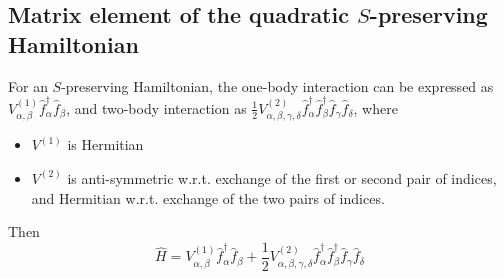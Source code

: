 \documentclass[12pt]{article}
\newcommand{\hc}{^\dagger}
\begin{document}
	\subsection{Matrix element of the quadratic $S$-preserving Hamiltonian}
	For an $S$-preserving Hamiltonian, the one-body interaction can be expressed as $V^{(1)}_{\alpha,\beta}\hat{f}\hc_\alpha\hat{f}_\beta$, and two-body interaction as $\frac{1}{2}V^{(2)}_{\alpha,\beta,\gamma,\delta}\hat{f}\hc_\alpha\hat{f}\hc_\beta\hat{f}_\gamma\hat{f}_\delta$, where
	\begin{itemize}
	\item $V^{(1)}$ is Hermitian
	\item $V^{(2)}$ is anti-symmetric w.r.t. exchange of the first or second pair of indices, and Hermitian w.r.t. exchange of the two pairs of indices.
	\end{itemize}
	Then
	\begin{equation}
	\hat{H}=V^{(1)}_{\alpha,\beta}\hat{f}\hc_\alpha\hat{f}_\beta+\frac{1}{2}V^{(2)}_{\alpha,\beta,\gamma,\delta}\hat{f}\hc_\alpha\hat{f}\hc_\beta\hat{f}_\gamma\hat{f}_\delta
	\end{equation}
	
	\appendix
	
\end{document}
